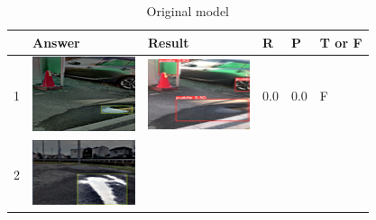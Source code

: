 \documentclass[10pt]{jarticle}
\begin{document}
    \begin{table}[H]
        \caption{Original model}
        \begin{tabular}{|l|l|l|l|l|l|}
        \hline
           & Answer & Result & R   & P   & T or F \\ \hline
        1  & \begin{minipage}{.1\textwidth}
            \centering
            \includegraphics[width=0.9\linewidth]{./fig/tab1_a.png}
        \end{minipage}       & \begin{minipage}{.1\textwidth}
            \centering
            \includegraphics[width=0.9\linewidth]{./fig/tab1_r.png}
           \end{minipage}       & 0.0 & 0.0 & F     \\ \hline
        2  & \begin{minipage}{.1\textwidth}
            \centering
            \includegraphics[width=0.9\linewidth]{./fig/tab2_a.png}

\end{minipage}
\end{tabular}
\end{table}
\end{document}

